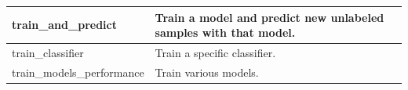 \begin{scriptsize}
\begin{longtable}{|m{4.3cm}|m{11cm}|}
		\hline
		train\_and\_predict & Train a model and predict new unlabeled samples with that model. \\
		
		\hline
		train\_classifier & Train a specific classifier. \\
		
		\hline
		train\_models\_performance & Train various models. \\
		
		\hline
		
	\end{longtable}
\end{scriptsize}




%
%		
%		
%		
%		
%								
%		
%		
%						
%		
%		
